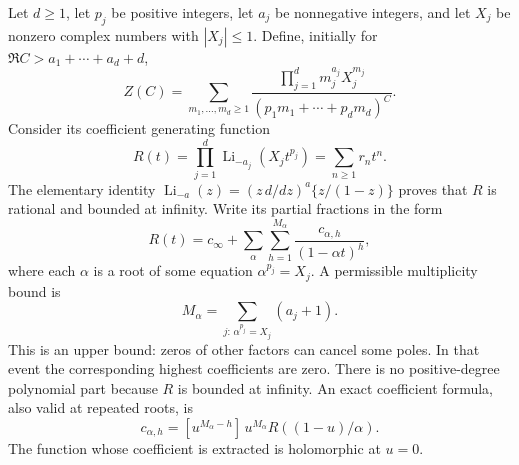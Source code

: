 \documentclass[11pt,a4paper]{article}
\theoremstyle{definition}
\theoremstyle{remark}
\numberwithin{equation}{section}
\begin{document}
Let $d\geq1$, let $p_j$ be positive integers, let $a_j$ be nonnegative
integers, and let $X_j$ be nonzero complex numbers with $|X_j|\leq1$.
Define, initially for $\Re C>a_1+\cdots+a_d+d$,
\begin{equation}\label{sp:weighteddef}
 Z(C)=\sum_{m_1,\ldots,m_d\geq1}
  \frac{\prod_{j=1}^d m_j^{a_j}X_j^{m_j}}
       {(p_1m_1+\cdots+p_dm_d)^C}.
\end{equation}
Consider its coefficient generating function
\begin{equation}\label{sp:rationalR}
 R(t)=\prod_{j=1}^d\operatorname{Li}_{-a_j}(X_jt^{p_j})
      =\sum_{n\geq1}r_nt^n.
\end{equation}
The elementary identity
$\operatorname{Li}_{-a}(z)=(z\,d/dz)^a\{z/(1-z)\}$ proves that
$R$ is rational and bounded at infinity.  Write its partial fractions
in the form
\begin{equation}\label{sp:partialR}
 R(t)=c_\infty+
       \sum_{\alpha}\sum_{h=1}^{M_\alpha}
           \frac{c_{\alpha,h}}{(1-\alpha t)^h},
\end{equation}
where each $\alpha$ is a root of some equation
$\alpha^{p_j}=X_j$.  A permissible multiplicity bound is
\[
 M_\alpha=\sum_{j:\,\alpha^{p_j}=X_j}(a_j+1).
\]
This is an upper bound: zeros of other factors can cancel some poles.
In that event the corresponding highest coefficients are zero.
There is no positive-degree polynomial part because $R$ is bounded
at infinity.  An exact coefficient formula, also valid at repeated
roots, is
\begin{equation}\label{sp:cformula}
 c_{\alpha,h}
   =[u^{M_\alpha-h}]\,
       u^{M_\alpha}R((1-u)/\alpha).
\end{equation}
The function whose coefficient is extracted is holomorphic at $u=0$.
\end{document}
